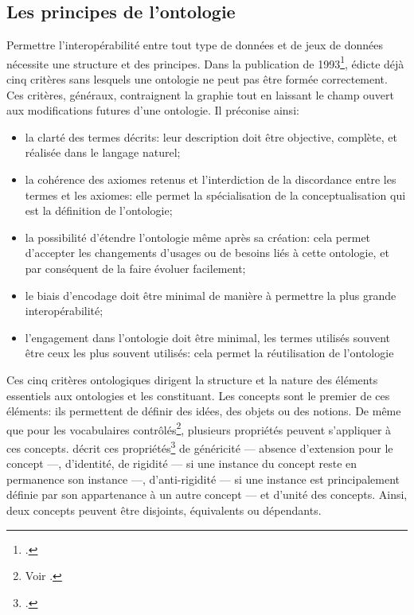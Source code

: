 \subsection{\label{II-B-1-c}Les principes de l'ontologie}

Permettre l'interopérabilité entre tout type de données et de jeux de données nécessite une structure et des principes. Dans la publication de 1993\footcite{gruber_toward_1993},  édicte déjà cinq critères sans lesquels une ontologie ne peut pas être formée correctement. Ces critères, généraux, contraignent la graphie tout en laissant le champ ouvert aux modifications futures d'une ontologie. Il préconise ainsi:
\begin{itemize}
	\item la clarté des termes décrits: leur description doit être objective, complète, et réalisée dans le langage naturel;
	\item la cohérence des axiomes retenus et l'interdiction de la discordance entre les termes et les axiomes: elle permet la spécialisation de la conceptualisation qui est la définition de l'ontologie;
	\item la possibilité d'étendre l'ontologie même après sa création: cela permet d'accepter les changements d'usages ou de besoins liés à cette ontologie, et par conséquent de la faire évoluer facilement;
	\item le biais d'encodage doit être minimal de manière à permettre la plus grande interopérabilité;
	\item l'engagement dans l'ontologie doit être minimal, les termes utilisés souvent être ceux les plus souvent utilisés: cela permet la réutilisation de l'ontologie
\end{itemize}
\bigskip

Ces cinq critères ontologiques dirigent la structure et la nature des éléments essentiels aux ontologies et les constituant. Les concepts sont le premier de ces éléments: ils permettent de définir des idées, des objets ou des notions. De même que pour les vocabulaires contrôlés\footnote{Voir .}, plusieurs propriétés peuvent s'appliquer à ces concepts.  décrit ces propriétés\footcite{guarino_formal_1998} de généricité --- absence d'extension pour le concept ---, d'identité, de rigidité --- si une instance du concept reste en permanence son instance ---, d'anti-rigidité --- si une instance est principalement définie par son appartenance à un autre concept --- et d'unité des concepts. Ainsi, deux concepts peuvent être disjoints, équivalents ou dépendants.\\

